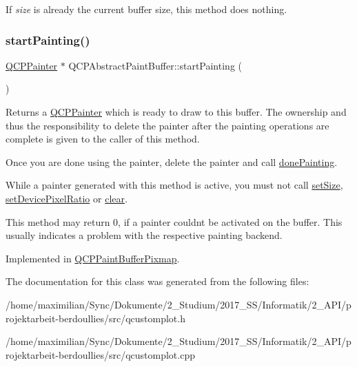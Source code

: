 If {\itshape size} is already the current buffer size, this method does nothing. \mbox{\label{class_q_c_p_abstract_paint_buffer_a9e9f29b19c033cf02fb96f1a148463f3}} 
\subsubsection{\texorpdfstring{start\+Painting()}{startPainting()}}
{\footnotesize\ttfamily \hyperlink{class_q_c_p_painter}{Q\+C\+P\+Painter} $\ast$ Q\+C\+P\+Abstract\+Paint\+Buffer\+::start\+Painting (\begin{DoxyParamCaption}{ }\end{DoxyParamCaption})\hspace{0.3cm}{\ttfamily [pure virtual]}}

Returns a \hyperlink{class_q_c_p_painter}{Q\+C\+P\+Painter} which is ready to draw to this buffer. The ownership and thus the responsibility to delete the painter after the painting operations are complete is given to the caller of this method.

Once you are done using the painter, delete the painter and call \hyperlink{class_q_c_p_abstract_paint_buffer_a41b0dc6e7744f19fae09f8532c207dc1}{done\+Painting}.

While a painter generated with this method is active, you must not call \hyperlink{class_q_c_p_abstract_paint_buffer_a8b68c3cd36533f1a4a23b5ce8cd66f01}{set\+Size}, \hyperlink{class_q_c_p_abstract_paint_buffer_a555eaad5d5c806420ff35602a1bb68fa}{set\+Device\+Pixel\+Ratio} or \hyperlink{class_q_c_p_abstract_paint_buffer_a9e253f4541dfc01992b77e8830bd7722}{clear}.

This method may return 0, if a painter couldn\textquotesingle{}t be activated on the buffer. This usually indicates a problem with the respective painting backend. 

Implemented in \hyperlink{class_q_c_p_paint_buffer_pixmap_a357964ef7d28cfa530338be4e5c93234}{Q\+C\+P\+Paint\+Buffer\+Pixmap}.



The documentation for this class was generated from the following files\+:\begin{DoxyCompactItemize}
\item 
/home/maximilian/\+Sync/\+Dokumente/2\+\_\+\+Studium/2017\+\_\+\+S\+S/\+Informatik/2\+\_\+\+A\+P\+I/projektarbeit-\/berdoullies/src/qcustomplot.\+h\item 
/home/maximilian/\+Sync/\+Dokumente/2\+\_\+\+Studium/2017\+\_\+\+S\+S/\+Informatik/2\+\_\+\+A\+P\+I/projektarbeit-\/berdoullies/src/qcustomplot.\+cpp\end{DoxyCompactItemize}
